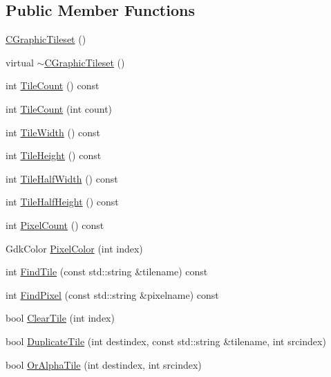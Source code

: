 \subsection*{Public Member Functions}
\begin{DoxyCompactItemize}
\item 
\hyperlink{classCGraphicTileset_a871889683273be71a94c73776fcd507b}{C\+Graphic\+Tileset} ()
\item 
virtual \hyperlink{classCGraphicTileset_ab80f78214ec2ec7da8eef15e8e0f523d}{$\sim$\+C\+Graphic\+Tileset} ()
\item 
int \hyperlink{classCGraphicTileset_a0d2f8ba4131b180243df3819cde783c3}{Tile\+Count} () const
\item 
int \hyperlink{classCGraphicTileset_a98f779275d9009a01e042d7a240ae995}{Tile\+Count} (int count)
\item 
int \hyperlink{classCGraphicTileset_af53f4cda22019c25b1f6ce05d5a1bdcd}{Tile\+Width} () const
\item 
int \hyperlink{classCGraphicTileset_a42aa03d1183ea881ce9d7b5545b564f3}{Tile\+Height} () const
\item 
int \hyperlink{classCGraphicTileset_aa34a25f396f9684aebc5f73c45356ea5}{Tile\+Half\+Width} () const
\item 
int \hyperlink{classCGraphicTileset_a958562733d2ac30643188503e774af32}{Tile\+Half\+Height} () const
\item 
int \hyperlink{classCGraphicTileset_af99f4b0ce58d25a5baaf836c74472910}{Pixel\+Count} () const
\item 
Gdk\+Color \hyperlink{classCGraphicTileset_af278c60b01100c430bedfcedd9e9489f}{Pixel\+Color} (int index)
\item 
int \hyperlink{classCGraphicTileset_ab8f2c2b2f2095b17d53c3dc475d5685c}{Find\+Tile} (const std\+::string \&tilename) const
\item 
int \hyperlink{classCGraphicTileset_a87047c22039dc6137b790b7609c627a8}{Find\+Pixel} (const std\+::string \&pixelname) const
\item 
bool \hyperlink{classCGraphicTileset_aefeefc9e2ad01ceb8a781bd455859f76}{Clear\+Tile} (int index)
\item 
bool \hyperlink{classCGraphicTileset_a78db70086b4cd1085fd3b5d0d0dc5fdd}{Duplicate\+Tile} (int destindex, const std\+::string \&tilename, int srcindex)
\item 
bool \hyperlink{classCGraphicTileset_ae456fe77a33c9954b6a22133f5843a15}{Or\+Alpha\+Tile} (int destindex, int srcindex)
\item 

\end{DoxyCompactItemize}

